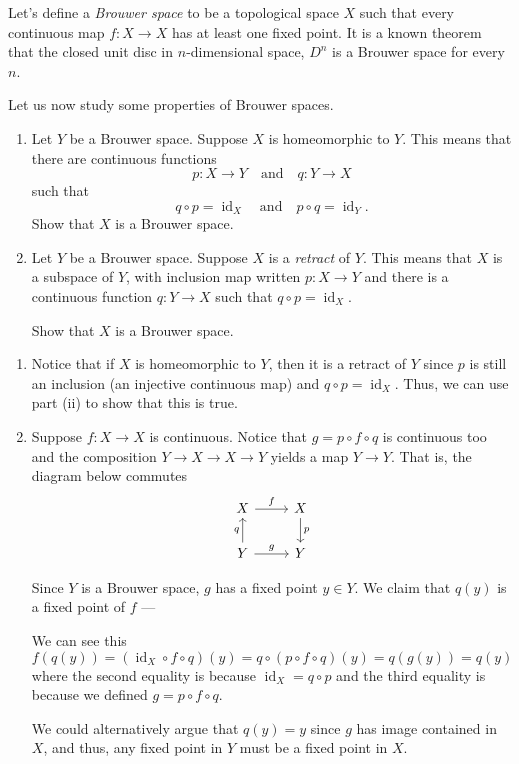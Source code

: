 \documentclass[12 pt, letterpaper]{hmcpset}
\begin{document}
\pagebreak

\begin{problem}[16.]
	Let's define a \emph{Brouwer space} to be a topological space $X$ such that every continuous map $f : X \to X$ has at least one fixed point. It is a known theorem that the closed unit disc in $n$-dimensional space, $D^{n}$ is a Brouwer space for every $n$.

	Let us now study some properties of Brouwer spaces.
	\begin{enumerate}
		\item Let $Y$ be a Brouwer space. Suppose $X$ is homeomorphic to $Y$. This means that there are continuous functions
			\[
				p : X \to Y \quad \text{and} \quad q : Y \to X
			\]
			such that
			\[
				q \circ p = \operatorname{id}_{X} \quad \text{and} \quad p \circ q = \operatorname{id}_{Y}.
			\]
			Show that $X$ is a Brouwer space.
		\item Let $Y$ be a Brouwer space. Suppose $X$ is a \emph{retract} of $Y$. This means that $X$ is a subspace of $Y$, with inclusion map written $p : X \to Y$ and there is a continuous function $q : Y \to X$ such that $q \circ p = \operatorname{id}_{X}$.

			Show that $X$ is a Brouwer space.
	\end{enumerate}
\end{problem}

\begin{solution}
	\begin{enumerate}
		\item Notice that if $X$ is homeomorphic to $Y$, then it is a retract of $Y$ since $p$ is still an inclusion (an injective continuous map) and $q \circ p = \operatorname{id}_{X}$. Thus, we can use part (ii) to show that this is true.
		\item Suppose $f : X \to X$ is continuous. Notice that $g = p \circ f \circ q$ is continuous too and the composition $Y \to X \to X \to Y$ yields a map $Y \to Y$. That is, the diagram below commutes
			\[
				\begin{tikzcd}
					X \ar[r, "f"] & X \ar[d, "p"] \\
					Y \ar[u, "q"] \ar[r, "g"] & Y
				\end{tikzcd}
			\]

			Since  $Y$ is a Brouwer space, $g$ has a fixed point $y \in Y$. We claim that $q(y)$ is a fixed point of $f$ --- 

			We can see this
			\[
				f(q(y)) = (\operatorname{id}_{X} \circ f \circ q)(y) = q \circ (p \circ f \circ q)(y) = q(g(y)) = q(y)
			\]
			where the second equality is because $\operatorname{id}_{X} = q \circ p$ and the third equality is because we defined $g = p \circ f \circ q$.

			We could alternatively argue that $q(y) = y$ since $g$ has image contained in $X$, and thus, any fixed point in $Y$ must be a fixed point in $X$.
	\end{enumerate}
\end{solution}
\end{document}
